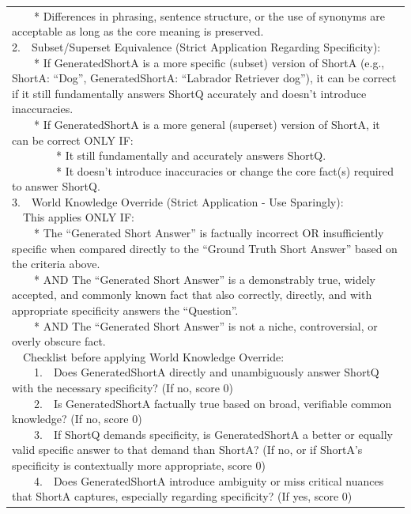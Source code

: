 \documentclass[11pt]{article}
\begin{document}
\begin{table}[t]
\begin{tabular}{@{}p{\textwidth}@{}}
{\ \ \ \ * Differences in phrasing, sentence structure, or the use of synonyms are acceptable as long as the core meaning is preserved.\\
2.\ \ Subset/Superset Equivalence (Strict Application Regarding Specificity):\\
\ \ \ \ * If GeneratedShortA is a more specific (subset) version of ShortA (e.g., ShortA: ``Dog'', GeneratedShortA: ``Labrador Retriever dog''), it can be correct if it still fundamentally answers ShortQ accurately and doesn't introduce inaccuracies.\\
\ \ \ \ * If GeneratedShortA is a more general (superset) version of ShortA, it can be correct ONLY IF:\\
\ \ \ \ \ \ \ \ * It still fundamentally and accurately answers ShortQ.\\
\ \ \ \ \ \ \ \ * It doesn't introduce inaccuracies or change the core fact(s) required to answer ShortQ.\\
3.\ \ World Knowledge Override (Strict Application - Use Sparingly):\\
\ \ This applies ONLY IF:\\
\ \ \ \ * The ``Generated Short Answer'' is factually incorrect OR insufficiently specific when compared directly to the ``Ground Truth Short Answer'' based on the criteria above.\\
\ \ \ \ * AND The ``Generated Short Answer'' is a demonstrably true, widely accepted, and commonly known fact that also correctly, directly, and with appropriate specificity answers the ``Question''.\\
\ \ \ \ * AND The ``Generated Short Answer'' is not a niche, controversial, or overly obscure fact.\\
\ \ Checklist before applying World Knowledge Override:\\
\ \ \ \ 1.\ \ Does GeneratedShortA directly and unambiguously answer ShortQ with the necessary specificity? (If no, score 0)\\
\ \ \ \ 2.\ \ Is GeneratedShortA factually true based on broad, verifiable common knowledge? (If no, score 0)\\
\ \ \ \ 3.\ \ If ShortQ demands specificity, is GeneratedShortA a better or equally valid specific answer to that demand than ShortA? (If no, or if ShortA's specificity is contextually more appropriate, score 0)\\
\ \ \ \ 4.\ \ Does GeneratedShortA introduce ambiguity or miss critical nuances that ShortA captures, especially regarding specificity? (If yes, score 0)\\
}
\end{tabular}
\end{table}
\end{document}
